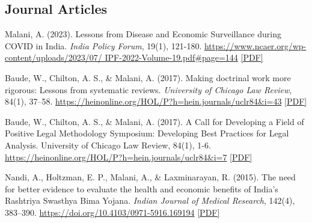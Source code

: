    \subsection*{Journal Articles}

    \begin{tablist}

        \item[2023] \tab{}Malani, A. (2023). Lessons from Disease and Economic Surveillance during COVID in India. \textit{India Policy Forum}, 19(1), 121-180. \href{https://www.ncaer.org/wp-content/uploads/2023/07/IPF-2022-Volume-19.pdf#page=144}{https://www.ncaer.org/wp-content/uploads/2023/07/ IPF-2022-Volume-19.pdf\#page=144} \href{https://github.com/anup-malani/website_personal/blob/main/publications/2023_Malani_LessonCOVIDSurveillanceIndia.pdf}{[PDF]}

        \item[2017] \tab{}Baude, W., Chilton, A. S., \& Malani, A. (2017). Making doctrinal work more rigorous: Lessons from systematic reviews. \textit{University of Chicago Law Review}, 84(1), 37–58. \href{https://heinonline.org/HOL/P?h=hein.journals/uclr84&i=43}{https://heinonline.org/HOL/P?h=hein.journals/uclr84\&i=43} \href{https://github.com/anup-malani/website_personal/blob/main/publications/2017_BaudeChiltonMalani_UCLR_DoctrinalMethod.pdf}{[PDF]}

        \item[2017] \tab{}Baude, W., Chilton, A. S., \& Malani, A. (2017). A Call for Developing a Field of Positive Legal Methodology Symposium: Developing Best Practices for Legal Analysis. University of Chicago Law Review, 84(1), 1-6. \href{https://heinonline.org/HOL/P?h=hein.journals/uclr84&i=7}{https://heinonline.org/HOL/P?h=hein.journals/uclr84\&i=7} \href{https://github.com/anup-malani/website_personal/blob/main/publications/2017_BaudeMalani_PositiveLegalMethodology.pdf}{[PDF]}
        
        \item[2015] \tab{}Nandi, A., Holtzman, E. P., Malani, A., \& Laxminarayan, R. (2015). The need for better evidence to evaluate the health and economic benefits of India's Rashtriya Swasthya Bima Yojana. \textit{Indian Journal of Medical Research}, 142(4), 383–390. \href{https://journals.lww.com/ijmr/fulltext/2015/42040/the_need_for_better_evidence_to_evaluate_the.6.aspx}{https://doi.org/10.4103/0971-5916.169194} \href{https://github.com/anup-malani/website_personal/blob/main/publications/2015_NandiMalaniEtAl_IJMR_IndiaHealthInsurance.pdf}{[PDF]}
        

\end{tablist}
